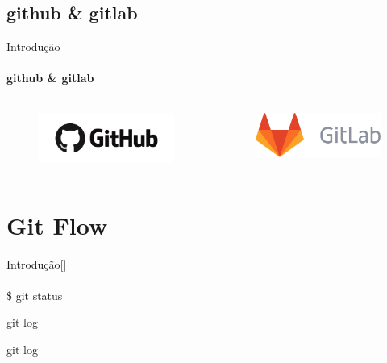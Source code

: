 \documentclass[xcolor=dvipsnames,t]{beamer}
\begin{document}
\subsection{github \& gitlab}
\begin{frame}{Introdução}
\framesubtitle{github \& gitlab}

\vfill
\begin{columns}[t]
	\begin{column}{.5\textwidth}
\begin{figure}
	\centering
	\includegraphics[width=0.7\linewidth]{figures/Github_logo}
\end{figure}
	\end{column}
	\begin{column}{.5\textwidth}
\begin{figure}
	\centering
	\includegraphics[width=0.7\linewidth]{figures/GitLab_logo}
\end{figure}
	\end{column}
\end{columns}
\vfill

\end{frame}

\section{Git Flow}
\begin{frame}{}
	\tiny
	\tableofcontents[current]
\end{frame}

\begin{frame}{Introdução}[]
	\framesubtitle{}
	\vfill	
	\begin{block}{}
		\$ git status
	\end{block}
	
	\begin{exampleblock}{}
		git log
	\end{exampleblock}
	
	\begin{alertblock}{}
		git log
	\end{alertblock}
	

\end{frame}
\end{document}
